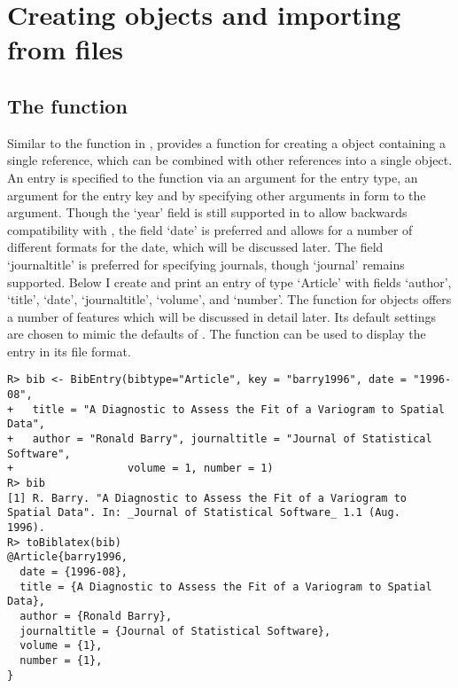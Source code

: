 \documentclass[article]{jss}\usepackage[]{graphicx}\usepackage[]{color}
\makeatletter
\newenvironment{kframe}{%
 \def\at@end@of@kframe{}%
 \ifinner\ifhmode%
  \def\at@end@of@kframe{\end{minipage}}%
  \begin{minipage}{\columnwidth}%
 \fi\fi%
 \def\FrameCommand##1{\hskip\@totalleftmargin \hskip-\fboxsep
 \colorbox{shadecolor}{##1}\hskip-\fboxsep
     \hskip-\linewidth \hskip-\@totalleftmargin \hskip\columnwidth}%
 \MakeFramed {\advance\hsize-\width
   \@totalleftmargin\z@ \linewidth\hsize
   \@setminipage}}%
 {\par\unskip\endMakeFramed%
 \at@end@of@kframe}
\newenvironment{knitrout}{}{} %
\newcommand{\ourpkg}{\pkg{RefManageR}}
\makeatother
\begin{document}
\section[Creating BibEntry objects and importing from files]{Creating  objects and importing from files}\label{sec_create}


\subsection[The BibEntry function]{The  function}
Similar to the  function in , \ourpkg{} provides a function  for creating a  object containing a single reference, which can be combined with other references into a single  object.  An entry is specified to the  function via an argument  for the entry type, an argument  for the entry key and by specifying other arguments
in  form to the  argument.  Though the `year' field is still supported in \Biblatex{} to allow backwards compatibility with \Bibtex{}, the field `date' is preferred and allows for a number of different formats for the date, which will be discussed later.  The field `journaltitle' is preferred for specifying journals, though `journal' remains supported.  Below I create and print an entry of type `Article' with fields `author', `title', `date', `journaltitle', `volume', and `number'.  The  function for  objects offers a number of features which will be discussed in detail later.  Its default settings are chosen to mimic the defaults of \Biblatex{}.  The  function can be used to display the entry in its  file format.
\begin{knitrout}
\color{fgcolor}\begin{kframe}
\begin{verbatim}
R> bib <- BibEntry(bibtype="Article", key = "barry1996", date = "1996-08", 
+   title = "A Diagnostic to Assess the Fit of a Variogram to Spatial Data",
+   author = "Ronald Barry", journaltitle = "Journal of Statistical Software",
+                  volume = 1, number = 1)
R> bib
[1] R. Barry. "A Diagnostic to Assess the Fit of a Variogram to
Spatial Data". In: _Journal of Statistical Software_ 1.1 (Aug.
1996).
R> toBiblatex(bib)
@Article{barry1996,
  date = {1996-08},
  title = {A Diagnostic to Assess the Fit of a Variogram to Spatial Data},
  author = {Ronald Barry},
  journaltitle = {Journal of Statistical Software},
  volume = {1},
  number = {1},
}
\end{verbatim}
\end{kframe}
\end{knitrout}
\end{document}
